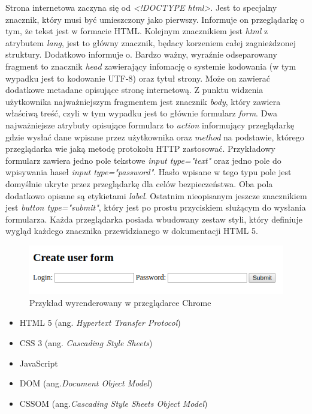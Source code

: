 \documentclass[polish, twoside, 12pt]{mwart}
\begin{document}


Strona internetowa zaczyna się od \emph{<!DOCTYPE html>}. Jest to specjalny znacznik, który musi być umieszczony jako pierwszy. Informuje on przeglądarkę o tym, że tekst jest w formacie HTML. Kolejnym znacznikiem jest \emph{html} z atrybutem \emph{lang}, jest to główny znacznik, będacy korzeniem całej zagnieżdzonej struktury. Dodatkowo informuje o. Bardzo ważny, wyraźnie odseparowany fragment to znacznik \emph{head} zawierający infomację o systemie kodowania (w tym wypadku jest to  kodowanie UTF-8) oraz tytuł strony. Może on zawierać dodatkowe metadane opisujące stronę internetową. Z punktu widzenia użytkownika najważniejszym fragmentem jest znacznik \emph{body}, który zawiera właściwą treść, czyli w tym wypadku jest to głównie formularz \emph{form}. Dwa najważniejsze atrybuty opisujące formularz to \emph{action} informujący przeglądarkę gdzie wysłać dane wpisane przez użytkownika oraz \emph{method} na podstawie, którego przeglądarka wie jaką metodę protokołu HTTP zastosować. Przykładowy formularz zawiera jedno pole tekstowe \emph{input type="text"} oraz jedno pole do wpisywania haseł \emph{input type="password"}. Hasło wpisane w tego typu pole jest domyślnie ukryte przez przeglądarkę dla celów bezpieczeństwa. Oba pola dodatkowo opisane są etykietami \emph{label}. Ostatnim nieopisanym jeszcze znacznikiem jest \emph{button type="submit"}, który jest po prostu przyciskiem służącym do wysłania formularza. Każda przeglądarka posiada wbudowany zestaw styli, który definiuje wygląd każdego znacznika przewidzianego w dokumentacji HTML 5.

\begin{figure}[ht]
    \includegraphics[width=\textwidth]{html-chrome.png}
	\caption{Przykład wyrenderowany w przeglądarce Chrome}
	\label{figure2}
\end{figure}

\begin{itemize}
\item HTML 5 (ang. \emph{Hypertext Transfer Protocol})
\item CSS 3 (ang. \emph{Cascading Style Sheets})
\item JavaScript
\item DOM (ang.\emph{Document Object Model})
\item CSSOM (ang.\emph{Cascading Style Sheets Object Model})
\end{itemize}
\end{document}
